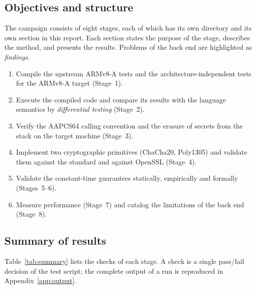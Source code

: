 \documentclass[11pt,a4paper]{article}
\begin{document}
\subsection{Objectives and structure}

The campaign consists of eight stages, each of which has its own directory
and its own section in this report. Each section states the purpose of the
stage, describes the method, and presents the results. Problems of the back
end are highlighted as \emph{findings}.

\begin{enumerate}[leftmargin=*,itemsep=1pt]
  \item Compile the upstream ARMv8-A tests and the architecture-independent
        tests for the ARMv8-A target (Stage~1).
  \item Execute the compiled code and compare its results with the language
        semantics by \emph{differential testing} (Stage~2).
  \item Verify the AAPCS64 calling convention and the erasure of secrets
        from the stack on the target machine (Stage~3).
  \item Implement two cryptographic primitives (ChaCha20, Poly1305) and
        validate them against the standard and against OpenSSL (Stage~4).
  \item Validate the constant-time guarantees statically, empirically and
        formally (Stages~5--6).
  \item Measure performance (Stage~7) and catalog the limitations of the
        back end (Stage~8).
\end{enumerate}

\subsection{Summary of results}

Table~\ref{tab:summary} lists the checks of each stage. A check is a single
pass/fail decision of the test script; the complete output of a run is
reproduced in Appendix~\ref{app:output}.
\end{document}
